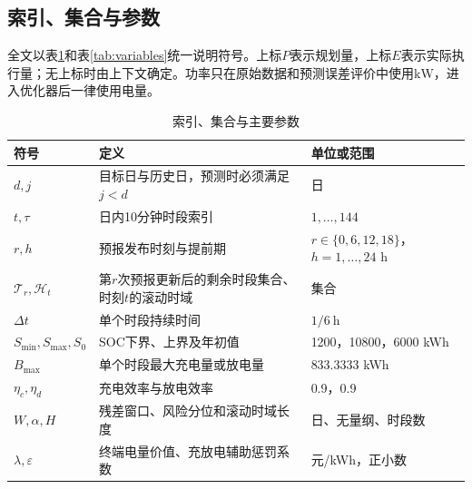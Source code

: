 \documentclass[UTF8,12pt,a4paper]{ctexart}
\theoremstyle{remark}
\begin{document}
\subsection{索引、集合与参数}
全文以表\ref{tab:index-parameters}和表\ref{tab:variables}统一说明符号。上标$P$表示规划量，上标$E$表示实际执行量；无上标时由上下文确定。功率只在原始数据和预测误差评价中使用$\mathrm{kW}$，进入优化器后一律使用电量。
\begin{table}[htbp]\centering\small\caption{索引、集合与主要参数}\label{tab:index-parameters}
\begin{tabular}{p{}p{}p{}}\toprule 符号&定义&单位或范围\\\midrule
$d,j$&目标日与历史日，预测时必须满足$j<d$&日\\
$t,\tau$&日内10分钟时段索引&$1,\ldots,144$\\
$r,h$&预报发布时刻与提前期&$r\in\{0,6,12,18\}$，$h=1,\ldots,24$ h\\
$\mathcal T_r,\mathcal H_t$&第$r$次预报更新后的剩余时段集合、时刻$t$的滚动时域&集合\\
$\Delta t$&单个时段持续时间&$1/6\ \mathrm h$\\
$S_{\min},S_{\max},S_0$&SOC下界、上界及年初值&1200，10800，6000 kWh\\
$B_{\max}$&单个时段最大充电量或放电量&833.3333 kWh\\
$\eta_c,\eta_d$&充电效率与放电效率&0.9，0.9\\
$W,\alpha,H$&残差窗口、风险分位和滚动时域长度&日、无量纲、时段数\\
$\lambda,\varepsilon$&终端电量价值、充放电辅助惩罚系数&元/kWh，正小数\\\bottomrule
\end{tabular}\end{table}
\end{document}
